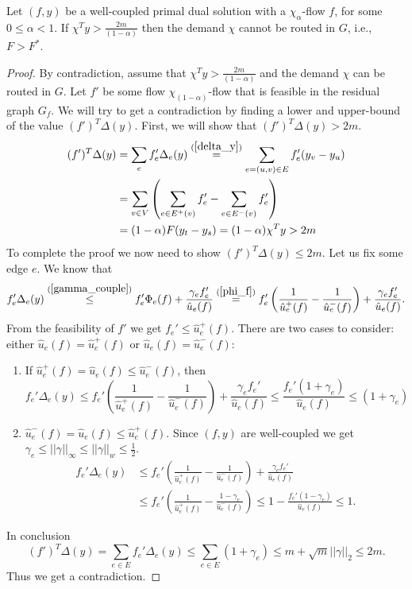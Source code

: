 \begin{lemma} \label{stop_lemma}
Let $(f,y)$ be a well-coupled primal dual solution with a $\chi_\alpha$-flow $f$, for some  $0\le\alpha<1$. If
$\chi^Ty>\frac{2m}{(1-\alpha)}$
then the demand $\chi$ cannot be routed in $G$, i.e., $F>F^*$.
\end{lemma}
\begin{proof}
By contradiction, assume that $\chi^Ty>\frac{2m}{(1-\alpha)}$ and the demand $\chi$ can be routed in $G$. Let $f'$ be some flow $\chi_{(1-\alpha)}$-flow that is feasible in the residual graph $G_f$. We will try to get a contradiction by finding a lower and upper-bound of the value $(f')^T\Delta(y)$. First, we will show that $(f')^T\Delta(y) > 2m$.
\begin{equation}
\begin{split}
    (f')^T\Delta(y)
    &= \sum_e f_e'\Delta_e(y)
    \stackrel{(\ref{delta_y})}{=} \sum_{e=(u,v)\in E}f_e'(y_v-y_u) \\
    &= \sum_{v \in V} \left(\sum_{e\in E^+(v)}f_e'-\sum_{e\in E^-(v)}f_e'\right) \\
    &= (1-\alpha)F(y_t-y_s)
    = (1-\alpha)\chi^Ty 
    > 2m
\end{split}
\end{equation}
To complete the proof we now need to show $(f')^T\Delta(y) \le 2m$. Let us fix some edge $e$. We know that
\[
f_e'\Delta_e(y)
\stackrel{(\ref{gamma_couple})}{\le} f_e'\Phi_e(f) + \frac{\gamma_ef_e'}{\hat u_e(f)}
\stackrel{(\ref{phi_f})}{=} f_e'\left(\frac{1}{\hat u_e^+(f)}-\frac{1}{\hat u_e^-(f)}\right)+\frac{\gamma_ef_e'}{\hat u_e(f)}.
\]
From the feasibility of $f'$ we get $f_e'\le \hat u_e^+(f)$.
There are two cases to consider: either $\hat u_e(f) = \hat u_e^+(f)$ or $\hat u_e(f) = \hat u_e^-(f)$:
\begin{enumerate}
\item If $\hat u_e^+(f) = \hat u_e(f) \le \hat u_e^-(f)$, then \\
    \[
    f_e'\Delta_e(y)
    \le f_e'\left(\frac{1}{\hat u_e^+(f)}-\frac{1}{\hat u_e^-(f)}\right)+\frac{\gamma_ef_e'}{\hat u_e(f)}
    \le \frac{f_e'(1+\gamma_e)}{\hat u_e(f)}
    \le (1+\gamma_e)
    \]
\item $\hat u_e^-(f) = \hat u_e(f) \le \hat u_e^+(f)$.
 Since $(f,y)$ are well-coupled we get $\gamma_e \le ||\gamma||_\infty \le ||\gamma||_w \le \frac{1}{2}$.
    \[
    \begin{split}
    f_e'\Delta_e(y)
    &\le f_e'\left(\frac{1}{\hat u_e^+(f)}-\frac{1}{\hat u_e^-(f)}\right)+\frac{\gamma_ef_e'}{\hat u_e(f)}\\
    &\le f_e'\left(\frac{1}{\hat u_e^+(f)}-\frac{1-\gamma_e}{\hat u_e^-(f)}\right)
    \le 1-\frac{f_e'(1-\gamma_e)}{\hat u_e(f)}
    \le 1.
    \end{split}
    \]
\end{enumerate}
In conclusion
\[
(f')^T\Delta(y)
= \sum_{e\in E}f_e'\Delta_e(y)
\le \sum_{e\in E}(1+\gamma_e)
\le m + \sqrt{m}||\gamma||_2
\le 2m.
\]
Thus we get a contradiction.
\end{proof}

